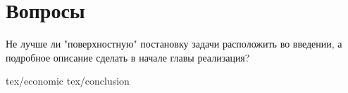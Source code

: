\documentclass[12pt,a4paper,oneside]{extarticle}
\begin{document}
    \section{Вопросы}

    Не лучше ли "поверхностную" постановку задачи расположить во введении, а подробное описание сделать в начале главы реализация?

    \clearpage


    
     \clearpage
    \tableofcontents \clearpage
     \clearpage
     \clearpage
     \clearpage
     \clearpage
     \clearpage
     \clearpage
     {tex/economic} \clearpage
     {tex/conclusion} \clearpage
     \clearpage
\end{document}
